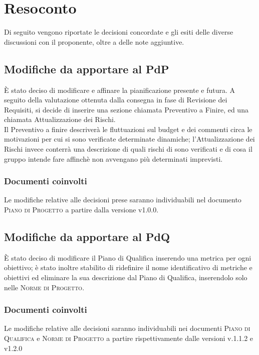 \documentclass{article}
\begin{document}
\section{Resoconto}
\label{sec:resoconto}

Di seguito vengono riportate le decisioni concordate e gli esiti delle diverse discussioni con il proponente, oltre a 
delle note aggiuntive.

\subsection{Modifiche da apportare al PdP}
\label{itm:1}

È stato deciso di modificare e affinare la pianificazione presente e futura. A seguito della valutazione ottenuta dalla consegna in fase di Revisione dei Requisiti, si decide di inserire una sezione chiamata Preventivo a Finire, ed una chiamata Attualizzazione dei Rischi. \\
Il Preventivo a finire descriverà le fluttuazioni sul budget e dei commenti circa le motivazioni per cui si sono verificate determinate dinamiche; l’Attualizzazione dei Rischi invece conterrà una descrizione di quali rischi di sono verificati e di cosa il gruppo intende fare affinchè non avvengano più determinati imprevisti.

\subsubsection*{Documenti coinvolti}
Le modifiche relative alle decisioni prese saranno individuabili nel documento \textsc{Piano di Progetto} a partire 
dalla versione v1.0.0.

\subsection{Modifiche da apportare al PdQ}
\label{itm:2}

È stato deciso di modificare il Piano di Qualifica inserendo una metrica per ogni obiettivo; è stato inoltre stabilito di ridefinire il nome identificativo di metriche e obiettivi ed eliminare la sua descrizione dal Piano di Qualifica, inserendolo solo nelle \textsc{Norme di Progetto}.\\

\subsubsection*{Documenti coinvolti} 
Le modifiche relative alle decisioni saranno individuabili nei documenti \textsc{Piano di Qualifica} e \textsc{Norme di Progetto} a partire rispettivamente dalle versioni v.1.1.2 e v1.2.0
\end{document}
